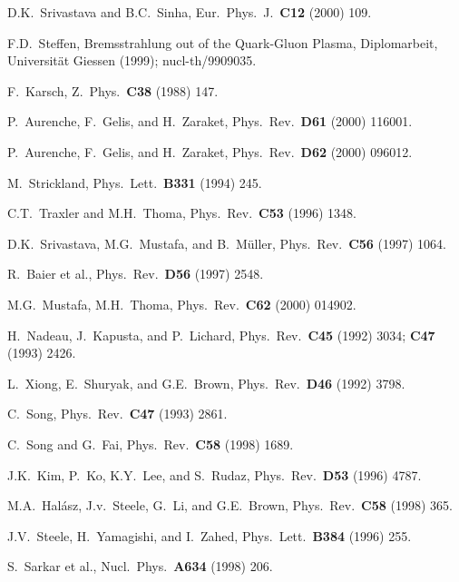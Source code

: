 \documentclass[12pt,twoside,fleqn]{article}
\begin{document}
\begin{thebibliography}{00}
 D.K.\ Srivastava and B.C.\ Sinha, Eur.\ Phys.\ J.\ {\bf C12} (2000) 109.
  
 F.D.\ Steffen, Bremsstrahlung out of the Quark-Gluon
  Plasma, Diplomarbeit, Universit\"at Giessen (1999); \mbox{nucl-th/9909035}.

 F.\ Karsch, Z.\ Phys.\ {\bf C38} (1988) 147.

 P.\ Aurenche, F.\ Gelis, and H.\ Zaraket, Phys.\ Rev.\ {\bf D61} (2000) 116001. 

 P.\ Aurenche, F.\ Gelis, and H.\ Zaraket, Phys.\ Rev.\ {\bf D62} (2000) 096012. 

 M.\ Strickland, Phys.\ Lett.\ {\bf B331} (1994) 245.

 C.T.\ Traxler and M.H.\ Thoma, Phys.\ Rev.\ {\bf C53} (1996) 1348.

 D.K.\ Srivastava, M.G.\ Mustafa, and B.\ M\"uller, Phys.\ Rev.\ {\bf C56} (1997) 1064.

 R.\ Baier et al., Phys.\ Rev.\ {\bf D56} (1997) 2548.

 M.G.\ Mustafa, M.H.\ Thoma, Phys.\ Rev.\ {\bf C62} (2000) 014902. 

  
 H.\ Nadeau, J.\ Kapusta, and P.\ Lichard, Phys.\ Rev.\ {\bf C45} (1992) 3034; {\bf C47} (1993) 2426.

 L.\ Xiong, E.\ Shuryak, and G.E.\ Brown, Phys.\ Rev.\ {\bf D46} (1992) 3798.

 C.\ Song, Phys.\ Rev.\ {\bf C47} (1993) 2861.

 C.\ Song and G.\ Fai, Phys.\ Rev.\ {\bf C58} (1998) 1689.

 J.K.\ Kim, P.\ Ko, K.Y.\ Lee, and S.\ Rudaz, Phys.\ Rev.\ {\bf D53} (1996) 4787.

 M.A.\ Hal\'{a}sz, J.v.\ Steele, G.\ Li, and G.E.\ Brown, Phys.\ Rev.\ {\bf C58} (1998) 365.

 J.V.\ Steele, H.\ Yamagishi, and I.\ Zahed, Phys.\ Lett.\ {\bf B384} (1996) 255.

 S.\ Sarkar et al., Nucl.\ Phys.\ {\bf A634} (1998) 206.


\end{thebibliography}
\end{document}
